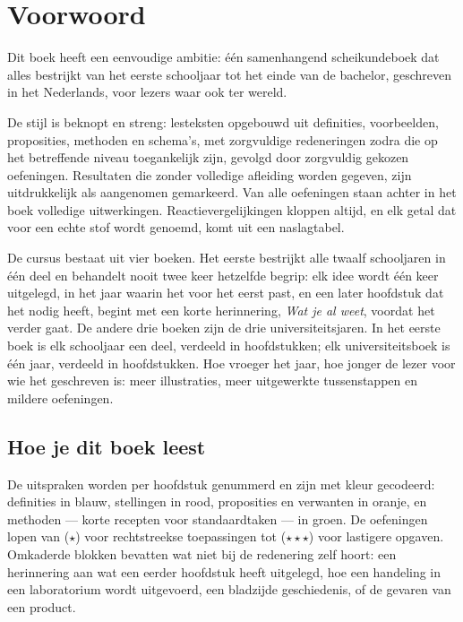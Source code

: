 \chapter{Voorwoord}

Dit boek heeft een eenvoudige ambitie: één samenhangend scheikundeboek dat
alles bestrijkt van het eerste schooljaar tot het einde van de bachelor,
geschreven in het Nederlands, voor lezers waar ook ter wereld.

De stijl is beknopt en streng: lesteksten opgebouwd uit definities,
voorbeelden, proposities, methoden en schema's, met zorgvuldige
redeneringen zodra die op het betreffende niveau toegankelijk zijn,
gevolgd door zorgvuldig gekozen oefeningen. Resultaten die zonder
volledige afleiding worden gegeven, zijn uitdrukkelijk als aangenomen
gemarkeerd. Van alle oefeningen staan achter in het boek volledige
uitwerkingen. Reactievergelijkingen kloppen altijd, en elk getal dat voor
een echte stof wordt genoemd, komt uit een naslagtabel.

De cursus bestaat uit vier boeken. Het eerste bestrijkt alle twaalf
schooljaren in één deel en behandelt nooit twee keer hetzelfde begrip:
elk idee wordt één keer uitgelegd, in het jaar waarin het voor het eerst
past, en een later hoofdstuk dat het nodig heeft, begint met een korte
herinnering, \emph{Wat je al weet}, voordat het verder gaat. De andere
drie boeken zijn de drie universiteitsjaren. In het eerste boek is elk
schooljaar een deel, verdeeld in hoofdstukken; elk universiteitsboek is
één jaar, verdeeld in hoofdstukken. Hoe vroeger het jaar, hoe jonger de
lezer voor wie het geschreven is: meer illustraties, meer uitgewerkte
tussenstappen en mildere oefeningen.

\section*{Hoe je dit boek leest}

De uitspraken worden per hoofdstuk genummerd en zijn met kleur gecodeerd:
definities in blauw, stellingen in rood, proposities en verwanten in
oranje, en methoden --- korte recepten voor standaardtaken --- in groen.
De oefeningen lopen van ($\star$) voor rechtstreekse toepassingen tot
($\star\star\star$) voor lastigere opgaven. Omkaderde blokken bevatten
wat niet bij de redenering zelf hoort: een herinnering aan wat een eerder
hoofdstuk heeft uitgelegd, hoe een handeling in een laboratorium wordt
uitgevoerd, een bladzijde geschiedenis, of de gevaren van een product.

